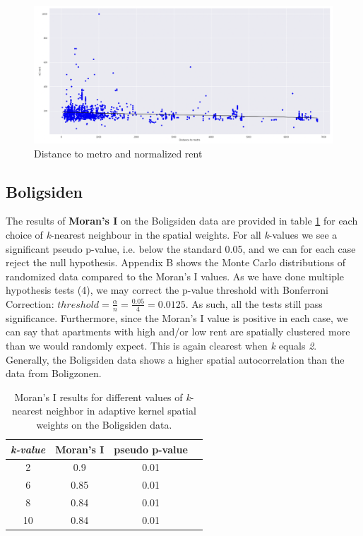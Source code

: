 \documentclass{article}
\begin{document}
\begin{figure}[!htbp]
    \centering
    \includegraphics[scale=0.35]{images/LinearReg_boligzonen.png}
    \caption{Distance to metro and normalized rent}
    \label{fig:dist_boligzonen}
\end{figure}



\subsection{Boligsiden}

The results of \textbf{Moran’s I} on the Boligsiden data are provided in table \ref{morans_I_boligsiden} for each choice of \textit{k}-nearest neighbour in the spatial weights. For all \textit{k}-values we see a significant pseudo p-value, i.e. below the standard 0.05, and we can for each case reject the null hypothesis. Appendix B shows the Monte Carlo distributions of randomized data compared to the Moran's I values. As we have done multiple hypothesis tests (4), we may correct the p-value threshold with Bonferroni Correction: $threshold = \frac{\alpha}{n} = \frac{0.05}{4} = 0.0125$. As such, all the tests still pass significance. Furthermore, since the Moran's I value is positive in each case, we can say that apartments with high and/or low rent are spatially clustered more than we would randomly expect. This is again clearest when \textit{k} equals \textit{2}. Generally, the Boligsiden data shows a higher spatial autocorrelation than the data from Boligzonen.

\begin{table}[h]
\renewcommand{\arraystretch}{1.3}
\label{morans_I_boligsiden}
\centering
\begin{tabular}{|c|c|c|c|}
\hline
\bfseries \textit{k-value} & \bfseries Moran's I & \bfseries pseudo p-value\\
\hline\hline
2 & 0.9 & 0.01 \\
6 & 0.85  & 0.01 \\
8 & 0.84 & 0.01 \\
10 & 0.84 & 0.01 \\
\hline
\end{tabular}
\caption{Moran's I results for different values of \textit{k}-nearest neighbor in adaptive kernel spatial weights on the Boligsiden data.}
\end{table}
\end{document}
